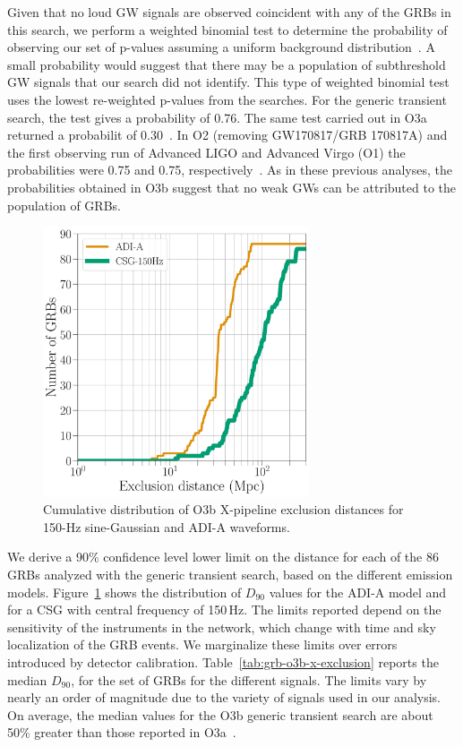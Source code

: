 Given that no loud \ac{GW} signals are observed coincident with any of the \acp{GRB} in this search, we perform a weighted binomial test to determine the probability of observing our set of p-values assuming a uniform background distribution~\citep{grb_s6}.
A small probability would suggest that there may be a population of subthreshold \ac{GW} signals that our search did not identify.
This type of weighted binomial test uses the lowest re-weighted p-values from the searches.
For the generic transient search, the test gives a probability of 0.76.
The same test carried out in O3a returned a probabilit of 0.30~\citep{grb_o3a}.
In \ac{O2} (removing GW170817/GRB 170817A) and the first observing run of Advanced LIGO and Advanced Virgo (O1) the probabilities were 0.75 and 0.75, respectively~\citep{grb_o2, grb_o1}.
As in these previous analyses, the probabilities obtained in O3b suggest that no weak GWs can be attributed to the population of GRBs.

\begin{figure}[h]
  \centering
  \includegraphics[width=0.7\textwidth]{figures/grb/o3b-x-exclusion.pdf}
  \caption{Cumulative distribution of O3b X-pipeline exclusion distances for 150-Hz sine-Gaussian and ADI-A waveforms.}
  \label{fig:grb-o3b-x-exclusion}
\end{figure}

We derive a 90\% confidence level lower limit on the distance for each of the 86 GRBs analyzed with the generic transient search, based on the different emission models.
Figure~\ref{fig:grb-o3b-x-exclusion} shows the distribution of $D_{90}$ values for the ADI-A model and for a CSG with central frequency of 150\,Hz.
The limits reported depend on the sensitivity of the instruments in the network, which change with time and sky localization of the GRB events.
We marginalize these limits over errors introduced by detector calibration.
Table~\ref{tab:grb-o3b-x-exclusion} reports the median $D_{90}$, for the set of GRBs for the different signals.
The limits vary by nearly an order of magnitude due to the variety of signals used in our analysis.
On average, the median values for the O3b generic transient search are about 50\% greater than those reported in O3a~\citep{grb_o3a}.


